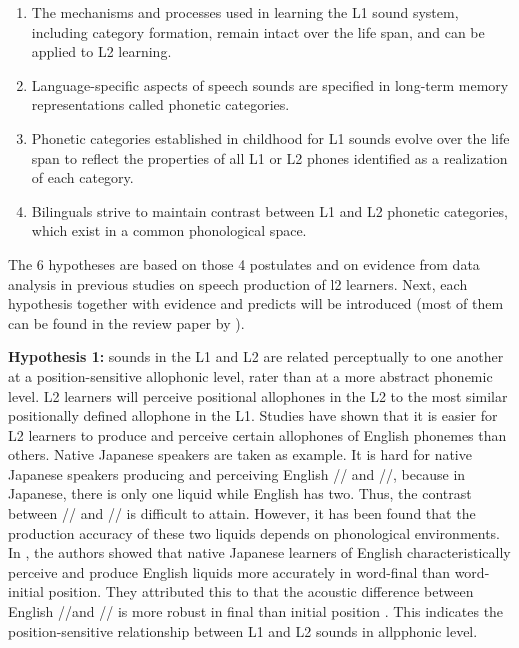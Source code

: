 \begin{enumerate}
\item The mechanisms and processes used in learning the L1 sound system, including category formation, remain intact over the life span, and can be applied to L2 learning.
\item Language-specific aspects of speech sounds are specified in long-term memory representations called phonetic categories.
\item Phonetic categories established in childhood for L1 sounds evolve over the life span to reflect the properties of all L1 or L2 phones identified as a realization of each category.
\item Bilinguals strive to maintain contrast between L1 and L2 phonetic categories, which exist in a common phonological space.
\end{enumerate}

The 6 hypotheses are based on those 4 postulates and on evidence from data analysis in previous studies on speech production of l2 learners. Next, each hypothesis together with evidence and predicts will be introduced (most of them can be found in the review paper by \cite{flege1995second}).

\textbf{Hypothesis 1:} sounds in the L1 and L2 are related perceptually to one another at a position-sensitive allophonic level, rater than at a more abstract phonemic level. L2 learners will perceive positional allophones in the L2 to the most similar positionally defined allophone in the L1. Studies have shown that it is easier for L2 learners to produce and perceive certain allophones of English phonemes than others. Native Japanese speakers are taken as example. It is hard for native Japanese speakers producing and perceiving English // and //, because in Japanese, there is only one liquid while English has two. Thus, the contrast between // and // is difficult to attain. However, it has been found that the production accuracy of these two liquids depends on phonological environments. In \citep{strange1992learning}, the authors showed that native Japanese learners of English characteristically perceive and produce English liquids more accurately in word-final than word-initial position. They attributed this to that the acoustic difference between English //and // is more robust in final than initial position \citep{sheldon1982acquisition}. This indicates the position-sensitive relationship between L1 and L2 sounds in allpphonic level.

